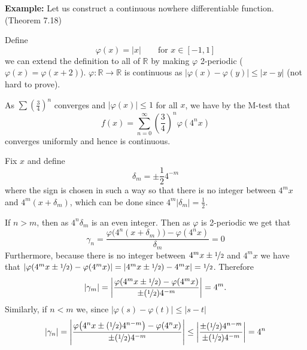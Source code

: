 \documentclass[12pt]{book}
\newcommand{\abs}[1]{\left\lvert {#1} \right\rvert}
\newcommand{\R}{{\mathbb{R}}}
\theoremstyle{plain}
\theoremstyle{remark}
\theoremstyle{definition}
\theoremstyle{exercise}
\theoremstyle{example}
\begin{document}
\medskip

\textbf{Example:} Let us construct a continuous nowhere differentiable function.  (Theorem 7.18)
\nopagebreak[4]

\medskip

Define
$$
\varphi(x) =\abs{x} \qquad \text{for $x \in [-1,1]$}
$$
we can extend the definition to all of $\R$ by making $\varphi$ 2-periodic
($\varphi(x) = \varphi(x+2)$).  $\varphi \colon \R \to \R$
is continuous as $\abs{\varphi(x)-\varphi(y)} \leq \abs{x-y}$ (not hard to
prove).

As $\sum {\left(\frac{3}{4}\right)}^n$ converges and $\abs{\varphi(x)} \leq
1$ for all $x$, we have by the M-test that
\begin{equation*}
f(x) = \sum_{n=0}^\infty 
{\left(\frac{3}{4}\right)}^n \varphi(4^n x)
\end{equation*}
converges uniformly and hence is continuous.

Fix $x$ and
define
$$
\delta_m = \pm \frac{1}{2} 4^{-m}
$$
where the sign is chosen in such a way so that there is no integer
between $4^m x$ and $4^m(x+\delta_m)$, which can be done
since $4^m\abs{\delta_m} = \frac{1}{2}$.

If $n > m$, then as $4^n\delta_m$ is an even integer.  Then as $\varphi$
is 2-periodic we get that
\begin{equation*}
\gamma_n =
\frac{\varphi\bigl(4^n(x+\delta_m)\bigr)-\varphi(4^nx)}{\delta_m} = 0
\end{equation*}
Furthermore, because there is no integer between 
$4^mx\pm\nicefrac{1}{2}$ and $4^mx$ we have that
$\abs{\varphi(4^mx\pm\nicefrac{1}{2})-\varphi(4^mx)} =
\abs{4^mx\pm\nicefrac{1}{2})-4^mx} = \nicefrac{1}{2}$.  Therefore
\begin{equation*}
\abs{\gamma_m} =
\abs{
\frac{\varphi(4^mx\pm\nicefrac{1}{2})-\varphi(4^mx)}{\pm (\nicefrac{1}{2}) 4^{-m}}
}
= 4^m .
\end{equation*}
Similarly, if $n < m$ we, since $\abs{\varphi(s) -\varphi(t)} \leq \abs{s-t}$
\begin{equation*}
\abs{\gamma_n} =
\abs{\frac{\varphi\bigl(4^nx\pm(\nicefrac{1}{2})4^{n-m}\bigr)-\varphi(4^nx)}{\pm
(\nicefrac{1}{2}) 4^{-m}}}
\leq
\abs{\frac{\pm(\nicefrac{1}{2})4^{n-m}}{\pm (\nicefrac{1}{2}) 4^{-m}}} = 4^n
\end{equation*}
\end{document}
